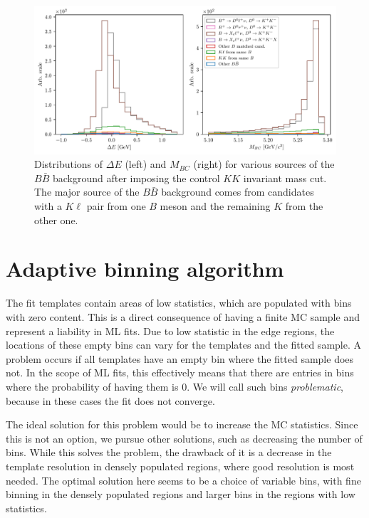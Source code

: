 \begin{figure}[H]
	\centering
	\captionsetup{width=0.8\linewidth}
	\includegraphics[width=\linewidth]{fig/cs_BKG_composition}
	\caption{Distributions of $\Delta E$ (left) and $M_{BC}$ (right) for various sources of the $B \bar B$ background after imposing the control $KK$ invariant mass cut. The major source of the $B \bar B$ background comes from candidates with a $K\ell$ pair from one $B$ meson and the remaining $K$ from the other one.}
	\label{fig:cs_BKG_comp}
\end{figure}


\section{Adaptive binning algorithm}\label{sec:adaptive-binning-algorithm}

The fit templates contain areas of low statistics, which are populated with bins with zero content. This is a direct consequence of having a finite MC sample and represent a liability in ML fits. Due to low statistic in the edge regions, the locations of these empty bins can vary for the templates and the fitted sample. A problem occurs if all templates have an empty bin where the fitted sample does not. In the scope of ML fits, this effectively means that there are entries in bins where the probability of having them is $0$. We will call such bins \textit{problematic}, because in these cases the fit does not converge.

The ideal solution for this problem would be to increase the MC statistics. Since this is not an option, we pursue other solutions, such as decreasing the number of bins. While this solves the problem, the drawback of it is a decrease in the template resolution in densely populated regions, where good resolution is most needed. The optimal solution here seems to be a choice of variable bins, with fine binning in the densely populated regions and larger bins in the regions with low statistics.

